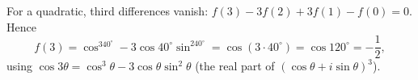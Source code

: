 For a quadratic, third differences vanish: $f(3)-3f(2)+3f(1)-f(0)=0$. Hence
\[f(3)=\cos^340^\circ-3\cos40^\circ\sin^240^\circ=\cos(3\cdot40^\circ)=\cos120^\circ=\boxed{-\dfrac{1}{2}},\]
using $\cos3\theta=\cos^3\theta-3\cos\theta\sin^2\theta$ (the real part of $(\cos\theta+i\sin\theta)^3$).
